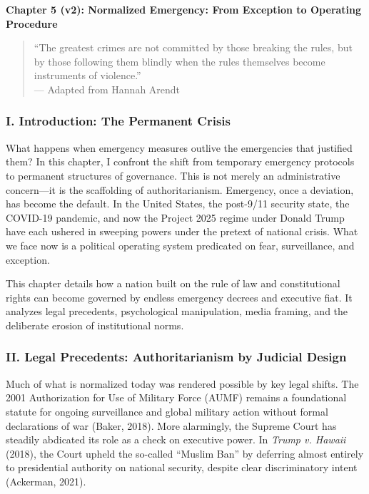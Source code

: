 \textbf{Chapter 5 (v2): Normalized Emergency: From Exception to
Operating Procedure}

\begin{quote}
``The greatest crimes are not committed by those breaking the rules, but
by those following them blindly when the rules themselves become
instruments of violence.''\\
--- Adapted from Hannah Arendt
\end{quote}

\subsubsection{I. Introduction: The Permanent
Crisis}\label{i.-introduction-the-permanent-crisis}

What happens when emergency measures outlive the emergencies that
justified them? In this chapter, I confront the shift from temporary
emergency protocols to permanent structures of governance. This is not
merely an administrative concern---it is the scaffolding of
authoritarianism. Emergency, once a deviation, has become the default.
In the United States, the post-9/11 security state, the COVID-19
pandemic, and now the Project 2025 regime under Donald Trump have each
ushered in sweeping powers under the pretext of national crisis. What we
face now is a political operating system predicated on fear,
surveillance, and exception.

This chapter details how a nation built on the rule of law and
constitutional rights can become governed by endless emergency decrees
and executive fiat. It analyzes legal precedents, psychological
manipulation, media framing, and the deliberate erosion of institutional
norms.

\subsubsection{II. Legal Precedents: Authoritarianism by Judicial
Design}\label{ii.-legal-precedents-authoritarianism-by-judicial-design}

Much of what is normalized today was rendered possible by key legal
shifts. The 2001 Authorization for Use of Military Force (AUMF) remains
a foundational statute for ongoing surveillance and global military
action without formal declarations of war (Baker, 2018). More
alarmingly, the Supreme Court has steadily abdicated its role as a check
on executive power. In \emph{Trump v. Hawaii} (2018), the Court upheld
the so-called ``Muslim Ban'' by deferring almost entirely to
presidential authority on national security, despite clear
discriminatory intent (Ackerman, 2021).

